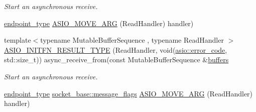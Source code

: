 \begin{DoxyCompactItemize}
\begin{DoxyCompactList}\small\item\em Start an asynchronous receive. \end{DoxyCompactList}\item 
\hyperlink{classasio_1_1basic__datagram__socket_af952c8d18c85588a16531cfc54a172bb}{endpoint\+\_\+type} \hyperlink{classasio_1_1basic__datagram__socket_a52737304bd2c1f82c813dd8851edbbf2}{A\+S\+I\+O\+\_\+\+M\+O\+V\+E\+\_\+\+A\+R\+G} (Read\+Handler) handler)
\item 
{\footnotesize template$<$typename Mutable\+Buffer\+Sequence , typename Read\+Handler $>$ }\\\hyperlink{classasio_1_1basic__datagram__socket_a0fff1383edb275747411a8045697543a}{A\+S\+I\+O\+\_\+\+I\+N\+I\+T\+F\+N\+\_\+\+R\+E\+S\+U\+L\+T\+\_\+\+T\+Y\+P\+E} (Read\+Handler, void(\hyperlink{classasio_1_1error__code}{asio\+::error\+\_\+code}, std\+::size\+\_\+t)) async\+\_\+receive\+\_\+from(const Mutable\+Buffer\+Sequence \&\hyperlink{group__async__read_ga54dede45c3175148a77fe6635222c47d}{buffers}
\begin{DoxyCompactList}\small\item\em Start an asynchronous receive. \end{DoxyCompactList}\item 
\hyperlink{classasio_1_1basic__datagram__socket_af952c8d18c85588a16531cfc54a172bb}{endpoint\+\_\+type} \hyperlink{classasio_1_1socket__base_ac3cf77465dfedfe1979b5415cf32cc94}{socket\+\_\+base\+::message\+\_\+flags} \hyperlink{classasio_1_1basic__datagram__socket_a1575e25e819d9578a971a05b9696cdb0}{A\+S\+I\+O\+\_\+\+M\+O\+V\+E\+\_\+\+A\+R\+G} (Read\+Handler) handler)
\end{DoxyCompactItemize}
